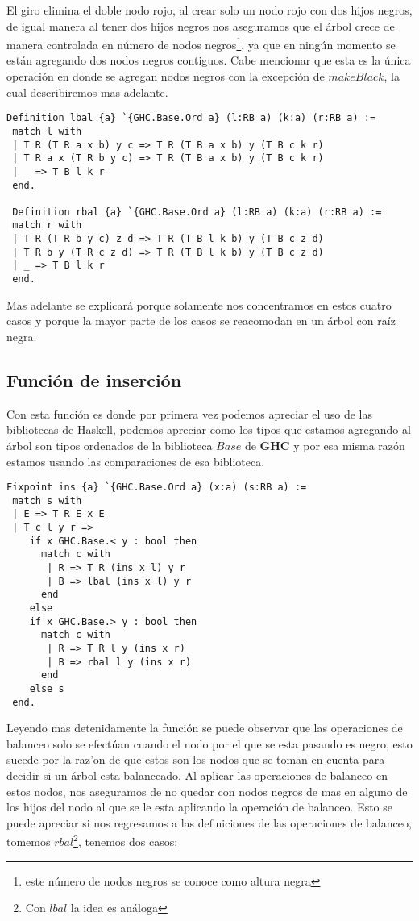 \documentclass[letterpaper,12pt,oneside]{book}
\theoremstyle{plain}
\theoremstyle{definition}
\theoremstyle{remark}
\begin{document}
El giro elimina el doble nodo rojo, al crear solo un nodo rojo con dos hijos negros, de igual manera al 
tener dos hijos negros nos aseguramos que el árbol crece de manera controlada en n\'umero de nodos 
negros\footnote{este n\'umero de nodos negros se conoce como altura negra}, ya que en ningún momento se 
están agregando dos nodos negros contiguos. Cabe mencionar que esta es la única operación en donde se 
agregan nodos negros con la excepción de $makeBlack$, la cual describiremos mas adelante.

\begin{verbatim}
Definition lbal {a} `{GHC.Base.Ord a} (l:RB a) (k:a) (r:RB a) :=
 match l with
 | T R (T R a x b) y c => T R (T B a x b) y (T B c k r)
 | T R a x (T R b y c) => T R (T B a x b) y (T B c k r)
 | _ => T B l k r
 end.

 Definition rbal {a} `{GHC.Base.Ord a} (l:RB a) (k:a) (r:RB a) :=
 match r with
 | T R (T R b y c) z d => T R (T B l k b) y (T B c z d)
 | T R b y (T R c z d) => T R (T B l k b) y (T B c z d)
 | _ => T B l k r
 end.
\end{verbatim}

Mas adelante se explicar\'a porque solamente nos concentramos en estos cuatro casos y porque la mayor 
parte de los casos se reacomodan en un \'arbol con ra\'iz negra.

\subsection {Funci\'on de inserci\'on}
Con esta funci\'on es donde por primera vez podemos apreciar el uso de las  bibliotecas de Haskell, 
podemos apreciar como los tipos que estamos agregando al \'arbol son tipos ordenados de la biblioteca 
$Base$ de \textbf{GHC} y por esa misma raz\'on estamos usando las comparaciones de esa biblioteca.

\begin{verbatim}
Fixpoint ins {a} `{GHC.Base.Ord a} (x:a) (s:RB a) :=
 match s with
 | E => T R E x E
 | T c l y r =>
    if x GHC.Base.< y : bool then 
      match c with
       | R => T R (ins x l) y r
       | B => lbal (ins x l) y r
      end
    else 
    if x GHC.Base.> y : bool then 
      match c with
       | R => T R l y (ins x r)
       | B => rbal l y (ins x r)
      end
    else s
 end.
\end{verbatim}

Leyendo mas detenidamente la funci\'on se puede observar que las operaciones de balanceo solo se efectúan
cuando el nodo por el que se esta pasando es negro, esto sucede por la raz'on de que estos son los nodos 
que se toman en cuenta para decidir si un \'arbol esta balanceado. Al aplicar las operaciones de balanceo
en estos nodos, nos aseguramos de no quedar con nodos negros de mas en alguno de los hijos del nodo al 
que se le esta aplicando la operación de balanceo. Esto se puede apreciar si nos regresamos a las 
definiciones de las operaciones de balanceo, tomemos $rbal$\footnote{Con $lbal$ la idea es an\'aloga}, 
tenemos dos casos:
\end{document}
